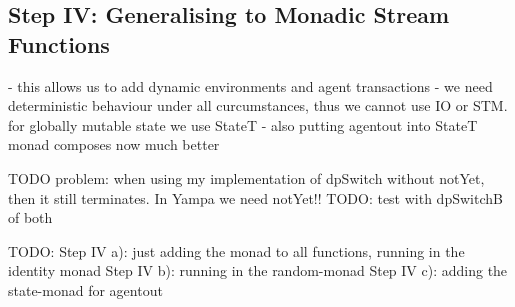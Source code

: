 \subsection{Step IV: Generalising to Monadic Stream Functions}
- this allows us to add dynamic environments and agent transactions
- we need deterministic behaviour under all curcumstances, thus we cannot use IO or STM. for globally mutable state we use StateT
- also putting agentout into StateT monad composes now much better

TODO problem: when using my implementation of dpSwitch without notYet, then it still terminates. In Yampa we need notYet!!
TODO: test with dpSwitchB of both 

TODO:
Step IV a): just adding the monad to all functions, running in the identity monad
Step IV b): running in the random-monad
Step IV c): adding the state-monad for agentout

